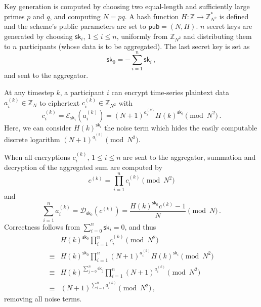 Key generation is computed by choosing two equal-length and sufficiently large primes $p$ and $q$, and computing $N=pq$. A hash function $H:\mathbb{Z} \rightarrow \mathbb{Z}_{N^2}^*$ is defined and the scheme's public parameters are set to $\mathsf{pub}=(N, H)$. $n$ secret keys are generated by choosing $\mathsf{sk}_i$, $1\leq i\leq n$, uniformly from $\mathbb{Z}_{N^2}$ and distributing them to $n$ participants (whose data is to be aggregated). The last secret key is set as
\begin{equation}
    \mathsf{sk}_0 = -\sum^{n}_{i=1}\mathsf{sk}_i\,,
\end{equation}
and sent to the aggregator.

At any timestep $k$, a participant $i$ can encrypt time-series plaintext data $a^{(k)}_{i} \in \mathbb{Z}_N$ to ciphertext $c^{(k)}_{i} \in \mathbb{Z}_{N^2}$ with
\begin{equation}
    c^{(k)}_{i} = \mathcal{E}_{\mathsf{sk}_i}\left(a^{(k)}_{i}\right) = (N+1)^{a^{(k)}_{i}} H(k)^{\mathsf{sk}_i} \pmod{N^2}\,.
\end{equation}
Here, we can consider $H(k)^{\mathsf{sk}_i}$ the noise term which hides the easily computable discrete logarithm $(N+1)^{a^{(k)}_{i}} \pmod{N^2}$.

When all encryptions $c^{(k)}_{i}$, $1\leq i\leq n$ are sent to the aggregator, summation and decryption of the aggregated sum are computed by
\begin{equation}\label{eq:prelims:joye_libert_agg_sum}
    c^{(k)} = \prod^{n}_{i=1}c^{(k)}_{i} \pmod{N^2} 
\end{equation}
and
\begin{equation}\label{eq:prelims:joye_libert_agg_dec}
    \sum^{n}_{i=1}a^{(k)}_{i} = \mathcal{D}_{\mathsf{sk}_0}\left(c^{(k)}\right) = \frac{H(k)^{\mathsf{sk}_0}c^{(k)}-1}{N} \pmod{N}\,.
\end{equation}
Correctness follows from $\sum^{n}_{i=0}\mathsf{sk}_i = 0$, and thus
\begin{equation*}
    \begin{split}
        &H(k)^{\mathsf{sk}_0}\prod^{n}_{i=1}c^{(k)}_{i} \pmod{N^2} \\
        \equiv &H(k)^{\mathsf{sk}_0}\prod^{n}_{i=1}(N+1)^{a^{(k)}_{i}} H(k)^{\mathsf{sk}_i} \pmod{N^2} \\
        \equiv &H(k)^{\sum^n_{j=0}\mathsf{sk}_j} \prod^{n}_{i=1}(N+1)^{a^{(k)}_{i}} \pmod{N^2} \\
        \equiv &(N+1)^{\sum^n_{i=1}a^{(k)}_{i}} \pmod{N^2}\,,
    \end{split}
\end{equation*}
removing all noise terms.

